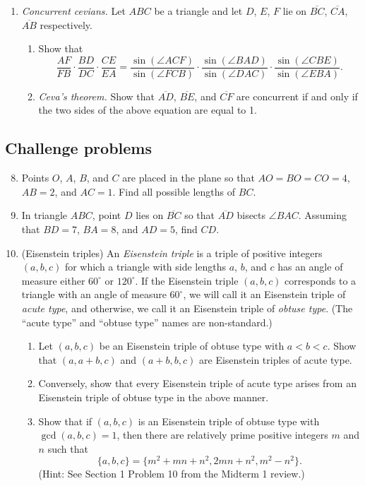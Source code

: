 \begin{enumerate}
\begin{enumerate}
\end{enumerate}
\item \emph{Concurrent cevians.} Let $ABC$ be a triangle and let $D$, $E$, $F$ lie on $\overline{BC}$, $\overline{CA}$, $\overline{AB}$ respectively.
\begin{enumerate}
\item Show that
\begin{equation*}
\frac{AF}{FB}\cdot\frac{BD}{DC}\cdot\frac{CE}{EA} = \frac{\sin(\angle ACF)}{\sin(\angle FCB)}\cdot\frac{\sin(\angle BAD)}{\sin(\angle DAC)}\cdot\frac{\sin(\angle CBE)}{\sin(\angle EBA)}.
\end{equation*}
\item \emph{Ceva's theorem.} Show that $\overline{AD}$, $\overline{BE}$, and $\overline{CF}$ are concurrent if and only if the two sides of the above equation are equal to 1.
\end{enumerate}
\end{enumerate}


\subsection{Challenge problems}

\begin{enumerate}\setcounter{enumi}{7}
\item Points $O$, $A$, $B$, and $C$ are placed in the plane so that $AO = BO = CO = 4$, $AB = 2$, and $AC = 1$. Find all possible lengths of $BC$.
\item In triangle $ABC$, point $D$ lies on $\overline{BC}$ so that $\overline{AD}$ bisects $\angle BAC$. Assuming that $BD = 7$, $BA = 8$, and $AD = 5$, find $CD$.
\item (Eisenstein triples) An \emph{Eisenstein triple} is a triple of positive integers $(a,b,c)$ for which a triangle with side lengths $a$, $b$, and $c$ has an angle of measure either $60^{\circ}$ or $120^{\circ}$. If the Eisenstein triple $(a,b,c)$ corresponds to a triangle with an angle of measure $60^{\circ}$, we will call it an Eisenstein triple of \emph{acute type}, and otherwise, we call it an Eisenstein triple of \emph{obtuse type}. (The ``acute type'' and ``obtuse type'' names are non-standard.)
\begin{enumerate}
\item Let $(a,b,c)$ be an Eisenstein triple of obtuse type with $a < b < c$. Show that $(a, a + b, c)$ and $(a + b, b, c)$ are Eisenstein triples of acute type.
\item Conversely, show that every Eisenstein triple of acute type arises from an Eisenstein triple of obtuse type in the above manner.
\item Show that if $(a,b,c)$ is an Eisenstein triple of obtuse type with $\gcd(a,b,c) = 1$, then there are relatively prime positive integers $m$ and $n$ such that
\begin{equation*}
\{a,b,c\} = \{m^2 + mn + n^2, 2mn + n^2, m^2 - n^2\}.
\end{equation*}
(Hint: See Section 1 Problem 10 from the Midterm 1 review.)
\end{enumerate}
\end{enumerate}


